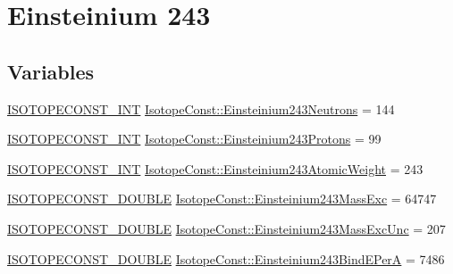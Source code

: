 \hypertarget{group___isotope_const-_einsteinium-_es243}{}\section{Einsteinium 243}
\label{group___isotope_const-_einsteinium-_es243}
\subsection*{Variables}
\begin{DoxyCompactItemize}
\item 
\mbox{\hyperlink{group___isotope_const-_macros_ga5f18360b3e99483a35c32d789e62621c}{I\+S\+O\+T\+O\+P\+E\+C\+O\+N\+S\+T\+\_\+\+I\+NT}} \mbox{\hyperlink{group___isotope_const-_einsteinium-_es243_ga02d0a0ef51747c12ccb78f40af96ee0c}{Isotope\+Const\+::\+Einsteinium243\+Neutrons}} = 144
\item 
\mbox{\hyperlink{group___isotope_const-_macros_ga5f18360b3e99483a35c32d789e62621c}{I\+S\+O\+T\+O\+P\+E\+C\+O\+N\+S\+T\+\_\+\+I\+NT}} \mbox{\hyperlink{group___isotope_const-_einsteinium-_es243_ga76357ef7329d102702d8311f457b40ab}{Isotope\+Const\+::\+Einsteinium243\+Protons}} = 99
\item 
\mbox{\hyperlink{group___isotope_const-_macros_ga5f18360b3e99483a35c32d789e62621c}{I\+S\+O\+T\+O\+P\+E\+C\+O\+N\+S\+T\+\_\+\+I\+NT}} \mbox{\hyperlink{group___isotope_const-_einsteinium-_es243_gac05c882b084f2f8aa59f2426e5f2f022}{Isotope\+Const\+::\+Einsteinium243\+Atomic\+Weight}} = 243
\item 
\mbox{\hyperlink{group___isotope_const-_macros_ga8f45a7272ce02c0b4c65c44636ed719a}{I\+S\+O\+T\+O\+P\+E\+C\+O\+N\+S\+T\+\_\+\+D\+O\+U\+B\+LE}} \mbox{\hyperlink{group___isotope_const-_einsteinium-_es243_ga3bdde88a80a10c74c03ece35cea1f60d}{Isotope\+Const\+::\+Einsteinium243\+Mass\+Exc}} = 64747
\item 
\mbox{\hyperlink{group___isotope_const-_macros_ga8f45a7272ce02c0b4c65c44636ed719a}{I\+S\+O\+T\+O\+P\+E\+C\+O\+N\+S\+T\+\_\+\+D\+O\+U\+B\+LE}} \mbox{\hyperlink{group___isotope_const-_einsteinium-_es243_ga992fa2fa0d9b4469f7e34db64f14ee27}{Isotope\+Const\+::\+Einsteinium243\+Mass\+Exc\+Unc}} = 207
\item 
\mbox{\hyperlink{group___isotope_const-_macros_ga8f45a7272ce02c0b4c65c44636ed719a}{I\+S\+O\+T\+O\+P\+E\+C\+O\+N\+S\+T\+\_\+\+D\+O\+U\+B\+LE}} \mbox{\hyperlink{group___isotope_const-_einsteinium-_es243_ga44fd71781ce9b1207876da4e7d82e5a9}{Isotope\+Const\+::\+Einsteinium243\+Bind\+E\+PerA}} = 7486
\item 

\end{DoxyCompactItemize}
